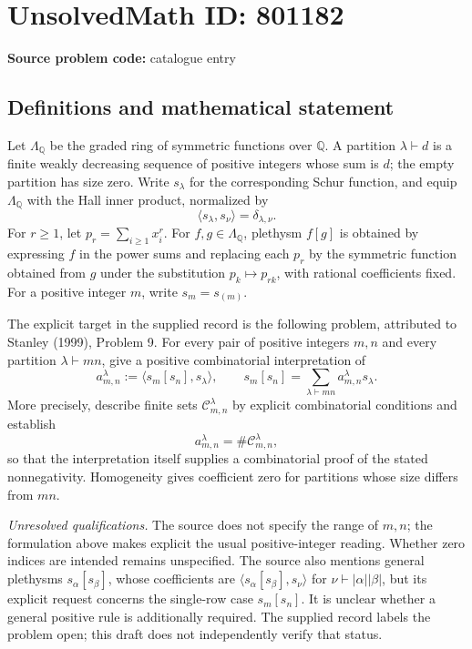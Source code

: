 \documentclass[11pt]{article}
\newcommand{\Q}{\mathbb{Q}}
\begin{document}
\section*{UnsolvedMath ID: 801182}
\textbf{Source problem code:} catalogue entry
\subsection{Definitions and mathematical statement}
Let \(\Lambda_{\Q}\) be the graded ring of symmetric functions over \(\Q\). A partition \(\lambda\vdash d\) is a finite weakly decreasing sequence of positive integers whose sum is \(d\); the empty partition has size zero. Write \(s_\lambda\) for the corresponding Schur function, and equip \(\Lambda_{\Q}\) with the Hall inner product, normalized by
\[
\langle s_\lambda,s_\nu\rangle=\delta_{\lambda,\nu}.
\]
For \(r\geq1\), let \(p_r=\sum_{i\geq1}x_i^r\). For \(f,g\in\Lambda_{\Q}\), plethysm \(f[g]\) is obtained by expressing \(f\) in the power sums and replacing each \(p_r\) by the symmetric function obtained from \(g\) under the substitution \(p_k\mapsto p_{rk}\), with rational coefficients fixed. For a positive integer \(m\), write \(s_m=s_{(m)}\).

The explicit target in the supplied record is the following problem, attributed to Stanley (1999), Problem 9. For every pair of positive integers \(m,n\) and every partition \(\lambda\vdash mn\), give a positive combinatorial interpretation of
\[
a_{m,n}^{\lambda}:=\langle s_m[s_n],s_\lambda\rangle,
\qquad
s_m[s_n]=\sum_{\lambda\vdash mn}a_{m,n}^{\lambda}s_\lambda.
\]
More precisely, describe finite sets \(\mathcal C_{m,n}^{\lambda}\) by explicit combinatorial conditions and establish
\[
a_{m,n}^{\lambda}=\#\mathcal C_{m,n}^{\lambda},
\]
so that the interpretation itself supplies a combinatorial proof of the stated nonnegativity. Homogeneity gives coefficient zero for partitions whose size differs from \(mn\).

\textit{Unresolved qualifications.} The source does not specify the range of \(m,n\); the formulation above makes explicit the usual positive-integer reading. Whether zero indices are intended remains unspecified. The source also mentions general plethysms \(s_\alpha[s_\beta]\), whose coefficients are \(\langle s_\alpha[s_\beta],s_\nu\rangle\) for \(\nu\vdash |\alpha||\beta|\), but its explicit request concerns the single-row case \(s_m[s_n]\). It is unclear whether a general positive rule is additionally required. The supplied record labels the problem open; this draft does not independently verify that status.
\end{document}
